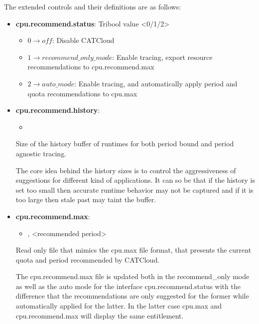 The extended controls and their definitions are as follows:
\begin{itemize}
    \item\textbf{cpu.recommend.status}: Tribool value <0/1/2>
        \begin{itemize}
            \item $0 \to off$: Disable CATCloud
            \item $1 \to recommend\_only\_mode$: Enable tracing, export resource recommendations to cpu.recommend.max
            \item $2 \to auto\_mode$: Enable tracing, and automatically apply period and quota recommendations to cpu.max
        \end{itemize}

    \item\textbf{cpu.recommend.history}:
        \begin{itemize}
            \item <period bound history size , period agnostic history size>
        \end{itemize}

    Size of the history buffer of runtimes for both period bound and period agnostic tracing.

    The core idea behind the history sizes is to control the aggressiveness of suggestions for different kind of applications. It can so be that if the history is set too small then accurate runtime behavior may not be captured and if it is too large then stale past may taint the buffer.
    \item\textbf{cpu.recommend.max}:
        \begin{itemize}
            \item <recommended quota>, <recommended period>
        \end{itemize}
    Read only file that mimics the cpu.max file format, that presents the current quota and period recommended by CATCloud.

    The cpu.recommend.max file is updated both in the recommend\_only mode as well as the auto mode for the interface cpu.recommend.status with the difference that the recommendations are only suggested for the former while automatically applied for the latter. In the latter case cpu.max and cpu.recommend.max will display the same entitlement.
\end{itemize}